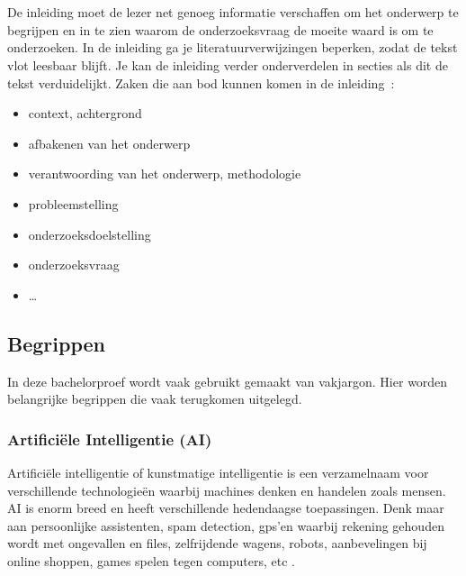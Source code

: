 
\chapter{}
\label{ch:inleiding}

De inleiding moet de lezer net genoeg informatie verschaffen om het onderwerp te begrijpen en in te zien waarom de onderzoeksvraag de moeite waard is om te onderzoeken. In de inleiding ga je literatuurverwijzingen beperken, zodat de tekst vlot leesbaar blijft. Je kan de inleiding verder onderverdelen in secties als dit de tekst verduidelijkt. Zaken die aan bod kunnen komen in de inleiding~:

\begin{itemize}
  \item context, achtergrond
  \item afbakenen van het onderwerp
  \item verantwoording van het onderwerp, methodologie
  \item probleemstelling
  \item onderzoeksdoelstelling
  \item onderzoeksvraag
  \item \ldots
\end{itemize}

\section{Begrippen}
\label{sec:begrippen}

In deze bachelorproef wordt vaak gebruikt gemaakt van vakjargon. Hier worden belangrijke begrippen die vaak terugkomen uitgelegd.

\subsection{Artificiële Intelligentie (AI)}
\label{subsec:begrippen-ai}

Artificiële intelligentie of kunstmatige intelligentie is een verzamelnaam voor verschillende technologieën waarbij machines denken en handelen zoals mensen. AI is enorm breed en heeft verschillende hedendaagse toepassingen. Denk maar aan persoonlijke assistenten, spam detection, gps’en waarbij rekening gehouden wordt met ongevallen en files, zelfrijdende wagens, robots, aanbevelingen bij online shoppen, games spelen tegen computers, etc \autocite{Fagella2020}.

